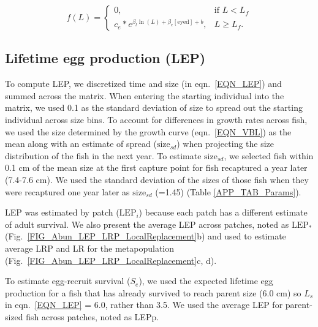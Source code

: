 \documentclass[12pt, oneside]{article}   	%
\begin{document}
\begin{equation}
f(L) = 
\begin{cases}
0, & \text{if } L < L_f \\
c_e * e^{\beta_l\ln(L) + \beta_e[\text{eyed}] + b}, & L \geq L_f. \label{EQN_Fec}
\end{cases}
\end{equation}


\subsection{Lifetime egg production (LEP)} \label{APP_SEC_METHODS_LEP}

To compute LEP, we discretized time and size (in eqn.\ \ref{EQN_LEP}) and summed across the matrix. When entering the starting individual into the matrix, we used 0.1 as the standard deviation of size to spread out the starting individual across size bins. To account for differences in growth rates across fish, we used the size determined by the growth curve (eqn.\ \ref{EQN_VBL}) as the mean along with an estimate of spread ($\text{size}_{sd}$) when projecting the size distribution of the fish in the next year. To estimate $\text{size}_{sd}$, we selected fish within 0.1 cm of the mean size at the first capture point for fish recaptured a year later (7.4-7.6 cm). We used the standard deviation of the sizes of those fish when they were recaptured one year later as $\text{size}_{sd}$ (=1.45) (Table \ref{APP_TAB_Params}). %

LEP was estimated by patch ($\text{LEP}_i$) because each patch has a different estimate of adult survival. We also present the average LEP across patches, noted as $\text{LEP}_*$ (Fig.\ \ref{FIG_Abun_LEP_LRP_LocalReplacement}b) and used to estimate average LRP and LR for the metapopulation (Fig.\ \ref{FIG_Abun_LEP_LRP_LocalReplacement}c, d). 

To estimate egg-recruit survival ($S_e$), we used the expected lifetime egg production for a fish that has already survived to reach parent size (6.0 cm) so $L_s$ in eqn.\ \ref{EQN_LEP} = 6.0, rather than 3.5. We used the average LEP for parent-sized fish across patches, noted as LEPp.
\end{document}

